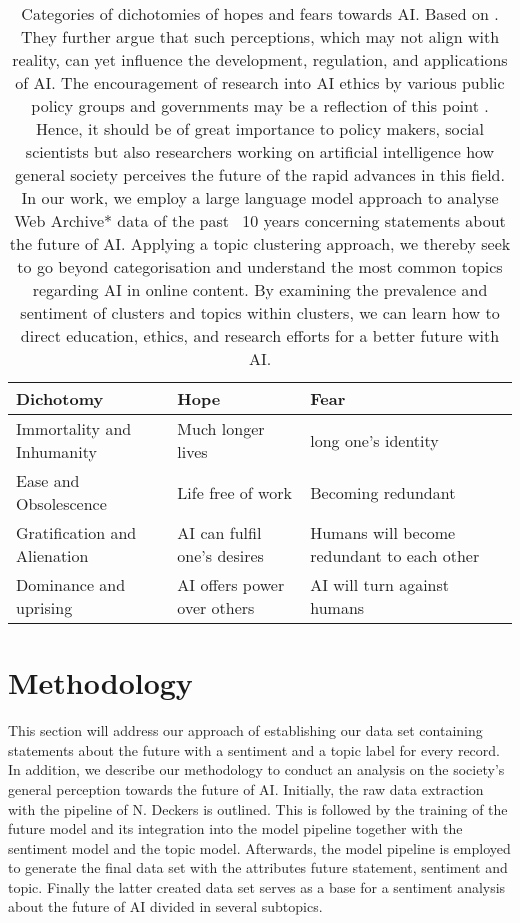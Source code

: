 \documentclass[11pt]{article}
\begin{document}
\begin{table*}
\centering
\begin{tabular}{lll}
\hline
\textbf{Dichotomy} & \textbf{Hope} & \textbf{Fear}\\
\hline
Immortality and Inhumanity & Much longer lives & long one's identity \\
Ease and Obsolescence & Life free of work & Becoming redundant \\
Gratification and Alienation  & AI can fulfil one's desires & Humans will become redundant to each other \\
Dominance and uprising & AI offers power over others & AI will turn against humans \\
\hline
\end{tabular}
\caption{\label{dichotomy-categories}
Categories of dichotomies of hopes and fears towards AI. Based on \citet{cave2019}.
They further argue that such perceptions, which may not align with reality, can yet influence the development, regulation, and applications of AI. The encouragement of research into AI ethics by various public policy groups and governments may be a reflection of this point \citep{leslie2019}. \\
Hence, it should be of great importance to policy makers, social scientists but also researchers working on artificial intelligence how general society perceives the future of the rapid advances in this field. In our work, we employ a large language model approach to analyse Web Archive* data of the past ~10 years concerning statements about the future of AI. Applying a topic clustering approach, we thereby seek to go beyond \citet{cave2019} categorisation and understand the most common topics regarding AI in online content. By examining the prevalence and sentiment of clusters and topics within clusters, we can learn how to direct education, ethics, and research efforts for a better future with AI. 
}
\end{table*}


\section{Methodology}
This section will address our approach of establishing our data set containing statements about the future with a sentiment and a topic label for every record. In addition, we describe our methodology to conduct an analysis on the society's general perception towards the future of AI. Initially, the raw data extraction with the pipeline of N. Deckers is outlined. This is followed by the training of the future model and its integration into the model pipeline together with the sentiment model and the topic model. Afterwards, the model pipeline is employed to generate the final data set with the attributes future statement, sentiment and topic.
Finally the latter created data set serves as a base for a sentiment analysis about the future of AI divided in several subtopics.
\end{document}
